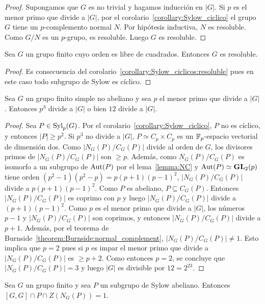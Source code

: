 \begin{proof}
	Supongamos que $G$ es no trivial y hagamos inducción en $|G|$. Si $p$ es el
	menor primo que divide a $|G|$, por el
	corolario~\ref{corollary:Sylow_ciclico} el grupo $G$ tiene un
	$p$-complemento normal $N$. Por hipótesis inductiva, $N$ es resoluble. Como
	$G/N$ es un $p$-grupo, es resoluble. Luego $G$ es resoluble.
\end{proof}

\begin{corollary}
	Sea $G$ un grupo finito cuyo orden es libre de cuadrados. Entonces $G$ es
	resoluble.
\end{corollary}

\begin{proof}
	Es consecuencia del corolario~\ref{corollary:Sylow_ciclicos:resoluble} pues
	en este caso todo subgrupo de Sylow es cíclico.  
\end{proof}

\begin{corollary}
	Sea $G$ un grupo finito simple no abeliano y sea $p$ el menor primo que
	divide a $|G|$. Entonces $p^3$ divide a $|G|$ o bien $12$ divide a $|G|$.
\end{corollary}

\begin{proof}
	Sea $P\in\mathrm{Syl}_p(G)$. Por el corolario~\ref{corollary:Sylow_ciclico}, $P$ no
	es cíclico, y entonces $|P|\geq p^2$. Si $p^3$ no divide a $|G|$, $P\simeq
	C_p\times C_p$ es un $\mathbb{F}_p$-espacio vectorial de dimensión dos. Como
	$|N_G(P)/C_G(P)|$ divide al orden de $G$, los divisores primos de
	$|N_G(P)/C_G(P)|$ son $\geq p$. Además, como $N_G(P)/C_G(P)$ es isomorfo a
	un subgrupo de $\operatorname{Aut}(P)$ por el lema~\ref{lemma:NC} y
	$\operatorname{Aut}(P)\simeq\mathbf{GL}_2(p)$ tiene orden $(p^2-1)(p^2-p)=p(p+1)(p-1)^2$,
	$|N_G(P)/C_G(P)|$ divide a $p(p+1)(p-1)^2$.  Como $P$ es abeliano,
	$P\subseteq C_G(P)$. Entonces $|N_G(P)/C_G(P)|$ es coprimo con $p$ y luego
	$|N_G(P)/C_G(P)|$ divide a $(p+1)(p-1)^2$. Como $p$ es el menor primo que
	divide a $|G|$, los números $p-1$ y $|N_G(P)/C_G(P)|$ son coprimos, y
	entonces $|N_G(P)/C_G(P)|$ divide a $p+1$.  Además, por el teorema de
	Burnside~\ref{theorem:Burnside:normal_complement}, $|N_G(P)/C_G(P)|\ne1$.
	Esto implica que $p=2$ pues si $p$ es impar el menor primo que divide a
	$|N_G(P)/C_G(P)|$ es $\geq p+2$.  Como entonces $p=2$, se concluye que
	$|N_G(P)/C_G(P)|=3$ y luego $|G|$ es divisible por $12=2^23$. 
\end{proof}

\begin{theorem}
	\label{theorem:[GG]PZNG(P)=1}
	Sea $G$ un grupo finito y sea $P$ un subgrupo de Sylow abeliano. Entonces 
	$[G,G]\cap P\cap Z(N_G(P))=1$.
\end{theorem}

